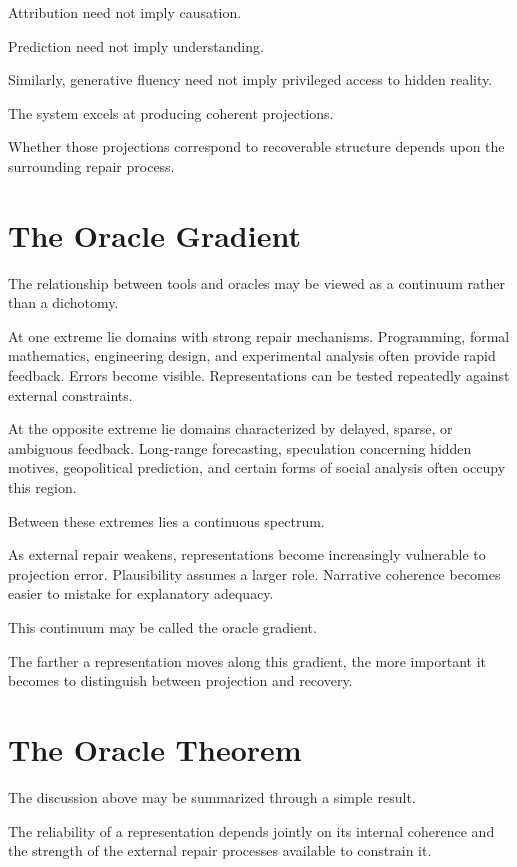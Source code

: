 \documentclass[11pt,oneside,openany]{book}
\begin{document}
Attribution need not imply causation.

Prediction need not imply understanding.

Similarly, generative fluency need not imply privileged access to hidden reality.

The system excels at producing coherent projections.

Whether those projections correspond to recoverable structure depends upon the surrounding repair process.

\section{The Oracle Gradient}

The relationship between tools and oracles may be viewed as a continuum rather than a dichotomy.

At one extreme lie domains with strong repair mechanisms. Programming, formal mathematics, engineering design, and experimental analysis often provide rapid feedback. Errors become visible. Representations can be tested repeatedly against external constraints.

At the opposite extreme lie domains characterized by delayed, sparse, or ambiguous feedback. Long-range forecasting, speculation concerning hidden motives, geopolitical prediction, and certain forms of social analysis often occupy this region.

Between these extremes lies a continuous spectrum.

As external repair weakens, representations become increasingly vulnerable to projection error. Plausibility assumes a larger role. Narrative coherence becomes easier to mistake for explanatory adequacy.

This continuum may be called the oracle gradient.

The farther a representation moves along this gradient, the more important it becomes to distinguish between projection and recovery.

\section{The Oracle Theorem}

The discussion above may be summarized through a simple result.

\begin{theorem}

The reliability of a representation depends jointly on its internal coherence and the strength of the external repair processes available to constrain it.

\end{theorem}
\end{document}
